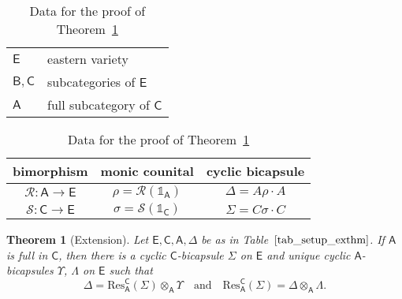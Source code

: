 \documentclass{amsart}
\newcommand{\Cat}[1]{\mathsf{#1}}
\newcommand{\cat}[1]{\Cat{#1}}
\newcommand{\acat}[1]{\mathsf{#1}}
\numberwithin{lstfloat}{section}
\newcommand{\one}{\mathbb{1}}
\newcommand{\func}[1]{\mathcal{#1}}
\newcommand{\cA}{\cat{A}}
\newcommand{\cB}{\cat{B}}
\newcommand{\cC}{\cat{C}}
\newcommand{\cE}{\cat{E}}
\newtheorem{thm}{Theorem}[section]
\theoremstyle{definition}
\theoremstyle{remark}
\numberwithin{equation}{section}
\begin{document}
  
\begin{table}[!htb]
  \begin{center}
  \begin{tabular}{l|p{1.5in}}
    $\cE$ & eastern variety\\
    $\cB,\cC$ &  subcategories of $\cE$\\
    $\cA$ & full subcategory of $\cC$
  \end{tabular}
\end{center}
  \renewcommand\arraystretch{1.3}
  \begin{center}
\begin{tabular}{c|c|c}
  bimorphism & monic counital & cyclic bicapsule\\\hline
  $\mathcal{R}: \cat{A}\to\cat{E}$ &  $\rho=\func{R}(\one_{\acat{A}})$ & $\Delta=A\rho\cdot A$\\
  $\mathcal{S}: \cat{C}\to\cat{E}$ &  $\sigma=\func{S}(\one_{\acat{C}})$ & $\Sigma=C\sigma\cdot C$
\end{tabular}
\end{center}
\caption{Data for the proof of Theorem~\ref{thm:extension}}
\label{tab_setup_exthm}
\end{table}


\begin{thm}[Extension]\label{thm:extension}
  Let $\acat{E},\acat{C},\acat{A},\Delta$ be as in Table~$\ref{tab_setup_exthm}$. 
  If $\acat{A}$ is full in $\acat{C}$, then 
there is a cyclic $\cC$-bicapsule $\cat{\Sigma}$ on $\cE$ and unique
  cyclic $\cA$-bicapsules $\cat{\Upsilon}$, $\cat{\Lambda}$ on $\cE$ such that 
\[
    \Delta = \mathrm{Res}_{\cA}^{\cC}(\Sigma)\otimes_{\cA}\Upsilon\quad\text{and}\quad
    \mathrm{Res}_{\cA}^{\cC}(\Sigma) = \Delta \otimes_{\acat{A}} \Lambda.
\]
\end{thm}
\end{document}
